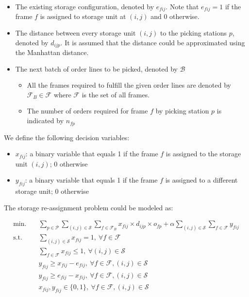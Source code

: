 \documentclass[a4, 11pt]{article}
\begin{document}
\begin{itemize}
	\item The existing storage configuration, denoted by $e_{fij}$. Note that $e_{fij} = 1$ if the frame $f$ is assigned to storage unit at $(i, j)$ and 0 otherwise.
	\item The distance between every storage unit $(i, j)$ to the picking stations $p$, denoted by $d_{ijp}$. It is assumed that the distance could be approximated using the Manhattan distance.
	\item The next batch of order lines to be picked, denoted by $\mathcal{B}$
		\begin{itemize}
			\item All the frames required to fulfill the given order lines are denoted by $\mathcal{F}_B \in \mathcal{F}$ where $\mathcal{F}$ is the set of all frames.
			\item The number of orders required for frame $f$ by picking station $p$ is indicated by $n_{fp}$
		\end{itemize}
\end{itemize}


We define the following decision variables:

\begin{itemize}
	\item $x_{fij}$: a binary variable that equals 1 if the frame $f$ is assigned to the storage unit $(i, j)$; 0 otherwise
	\item $y_{fij}$: a binary variable that equals 1 if the frame $f$ is assigned to a different storage unit; 0 otherwise
\end{itemize}


The storage re-assignment problem could be modeled as:


\begin{align}
	\text{min.} &\quad \sum_{p \in \mathcal{P}} \sum_{(i, j)  \in \mathcal{S}} \sum_{f \in \mathcal{F}_B} x_{fij} \times d_{ijp} \times o_{fp} + \alpha \sum_{(i, j)  \in \mathcal{S}} \sum_{f \in \mathcal{F}} y_{fij} \label{obj} \\
	\text{s.t.} &\quad \sum_{(i, j) \in \mathcal{S}} x_{fij} = 1, \ \forall f \in \mathcal{F} \label{frame-assign} \\
	&\quad \sum_{f \in \mathcal{F}} x_{fij} \leq 1, \ \forall (i, j) \in \mathcal{S} \label{unit-cap} \\
	&\quad y_{fij} \geq x_{fij} - e_{fij}, \ \forall f \in \mathcal{F}, (i, j) \in \mathcal{S} \label{change-1} \\
	&\quad y_{fij} \geq e_{fij} - x_{fij}, \ \forall f \in \mathcal{F}, (i, j) \in \mathcal{S} \label{change-2} \\
	&\quad x_{fij}, y_{fij} \in \{0, 1\}, \ \forall f \in \mathcal{F}, (i, j) \in \mathcal{S} \label{var-type}
\end{align}
\end{document}
